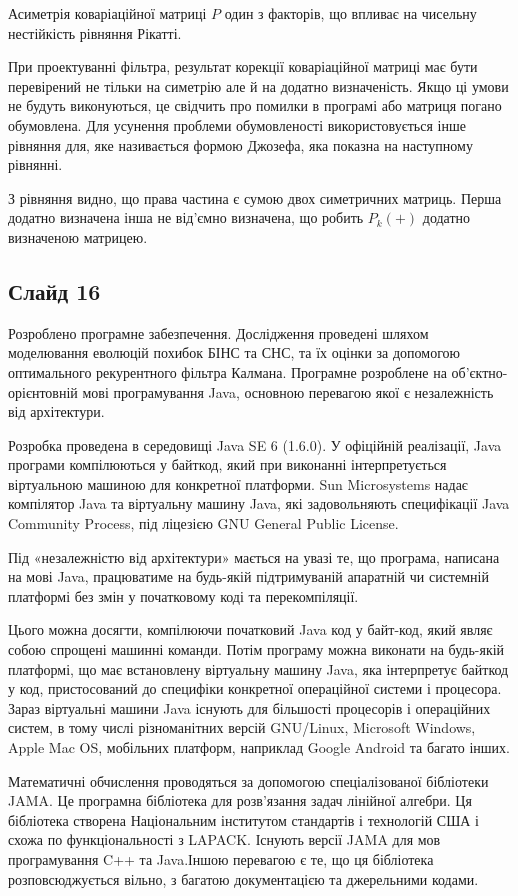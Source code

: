 \documentclass[ukrainian,utf8,simple,floatsubsection, hpadding=1mm,equationsubsection,]{eskdtext}
\begin{document}
Асиметрія коваріаційної матриці $P$ один з факторів, що впливає на чисельну
нестійкість рівняння Рікатті. 


При проектуванні фільтра, результат корекції коваріаційної матриці  
має бути перевірений не тільки на симетрію але й на додатно визначеність.
Якщо ці умови не будуть виконуються, це свідчить про помилки в програмі або
матриця погано обумовлена. Для усунення проблеми обумовленості використовується
інше рівняння для, яке називається формою Джозефа, яка показна на
наступному рівнянні.

З рівняння видно, що права частина є сумою двох симетричних матриць.
Перша додатно визначена інша не від'ємно визначена, що робить $P_{k}(+)$ 
додатно визначеною матрицею.
\subsection*{Слайд 16}
Розроблено програмне забезпечення. Дослідження проведені шляхом моделювання еволюцій похибок БІНС та СНС, та їх оцінки за допомогою оптимального рекурентного фільтра Калмана. Програмне розроблене на об'єктно-орієнтовній мові програмування Java, основною перевагою якої є незалежність від архітектури.

Розробка проведена в середовищі Java SE 6 (1.6.0). У офіційній реалізації, Java програми компілюються у байткод, який при виконанні інтерпретується віртуальною машиною для конкретної платформи. Sun Microsystems надає компілятор Java та віртуальну машину Java, які задовольняють специфікації Java Community Process, під ліцезією GNU General Public License. 

Під «незалежністю від архітектури» мається на увазі те, що програма, написана на мові Java, працюватиме на будь-якій підтримуваній апаратній чи системній платформі без змін у початковому коді та перекомпіляції.

Цього можна досягти, компілюючи початковий Java код у байт-код, який являє собою спрощені машинні команди. Потім програму можна виконати на будь-якій платформі, що має встановлену віртуальну машину Java, яка інтерпретує байткод у код, пристосований до специфіки конкретної операційної системи і процесора. Зараз віртуальні машини Java існують для більшості процесорів і операційних систем, в тому числі різноманітних версій GNU/Linux, Microsoft Windows, Apple Mac OS, мобільних платформ, наприклад Google Android та багато інших.

Математичні обчислення проводяться за допомогою спеціалізованої бібліотеки JAMA. Це програмна бібліотека для розв'язання задач лінійної алгебри. Ця бібліотека створена Національним інститутом стандартів і технологій США і схожа по функціональності з LAPACK. Існують версії JAMA для мов програмування C++ та Java.Іншою перевагою є те, що ця бібліотека розповсюджується вільно, з багатою документацією та джерельними кодами.
\end{document}
